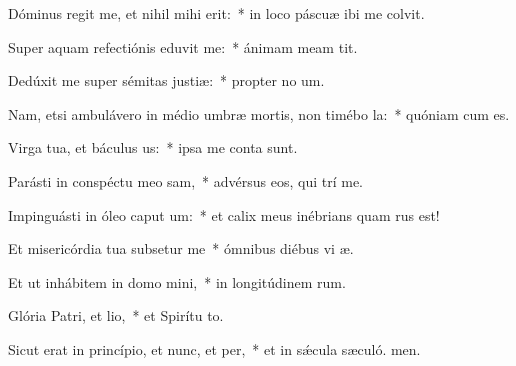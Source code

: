 \item Dóminus regit me, et nihil mihi erit:~* in loco páscuæ ibi me colvit.
\item Super aquam refectiónis eduvit me:~* ánimam meam tit.
\item Dedúxit me super sémitas justiæ:~* propter no um.
\item Nam, etsi ambulávero in médio umbræ mortis, non timébo la:~* quóniam  cum es.
\item Virga tua, et báculus us:~* ipsa me conta sunt.
\item Parásti in conspéctu meo sam,~* advérsus eos, qui trí me.
\item Impinguásti in óleo caput um:~* et calix meus inébrians quam rus est!
\item Et misericórdia tua subsetur me~* ómnibus diébus vi æ.
\item Et ut inhábitem in domo mini,~* in longitúdinem rum.
\item Glória Patri, et lio,~* et Spirítu to.
\item Sicut erat in princípio, et nunc, et per,~* et in sǽcula sæculó. men.
